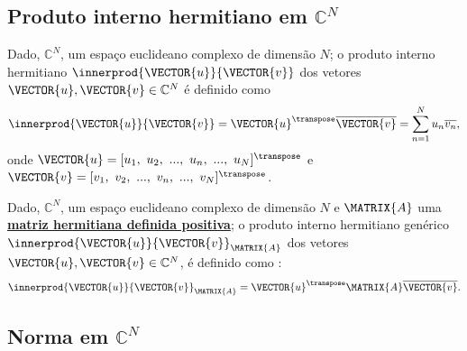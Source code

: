 \subsection{Produto interno hermitiano em $\mathbb{C}^N$}

\begin{definition}
Dado, $\mathbb{C}^N$, um espaço euclideano complexo de dimensão $N$;
o produto interno hermitiano $\innerprod{\VECTOR{u}}{\VECTOR{v}}$ dos vetores $\VECTOR{u},\VECTOR{v} \in \mathbb{C}^N$
é definido como \cite[pp. 44]{d2019hermitian} \cite[pp. 242]{damiano2011course}
\begin{equation}
\innerprod{\VECTOR{u}}{\VECTOR{v}}=\VECTOR{u}^{\transpose} \overline{\VECTOR{v}}=\sum_{n=1}^N u_n \overline{v_n},
\end{equation} 
onde $\VECTOR{u}=[u_1,~u_2,~...,~u_n,~...,~u_N]^{\transpose}$ e $\VECTOR{v}=[v_1,~v_2,~...,~v_n,~...,~v_N]^{\transpose}$.
\end{definition}

\begin{definition}
Dado, $\mathbb{C}^N$, um espaço euclideano complexo de dimensão $N$ e
$\MATRIX{A}$ uma \hyperref[def:hermitianapositivamatrix0]{\textbf{matriz hermitiana definida positiva}};
o produto interno hermitiano genérico $\innerprod{\VECTOR{u}}{\VECTOR{v}}_{\MATRIX{A}}$ 
dos vetores $\VECTOR{u},\VECTOR{v} \in \mathbb{C}^N$,
é definido como \cite[pp. 1358]{weisstein2002crc}:
\begin{equation}
\innerprod{\VECTOR{u}}{\VECTOR{v}}_{\MATRIX{A}}=\VECTOR{u}^{\transpose} \MATRIX{A} \overline{\VECTOR{v}}.
\end{equation} 
\end{definition}

\subsection{Norma em $\mathbb{C}^N$}

